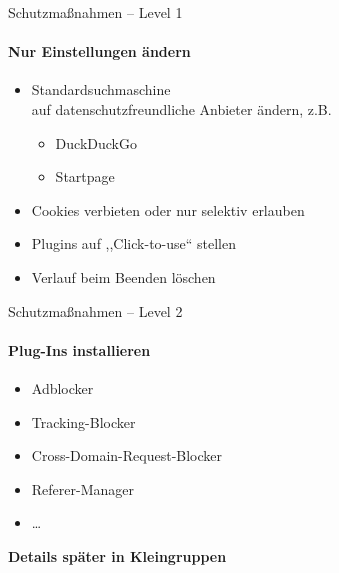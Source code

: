 \begin{frame}{Schutzmaßnahmen -- Level 1}
\framesubtitle{Nur Einstellungen ändern}
  \begin{itemize}
    \item Standardsuchmaschine\\ auf datenschutzfreundliche Anbieter ändern, z.B.
    \begin{itemize}
      \item DuckDuckGo
      \item Startpage
    \end{itemize}
    \item Cookies verbieten oder nur selektiv erlauben
    \item Plugins auf ,,Click-to-use`` stellen
    \item Verlauf beim Beenden löschen
  \end{itemize}

\end{frame}

\begin{frame}{Schutzmaßnahmen -- Level 2}
\framesubtitle{Plug-Ins installieren}
  \begin{itemize}
    \item Adblocker
    \item Tracking-Blocker
    \item Cross-Domain-Request-Blocker
    \item Referer-Manager
    \item \ldots
  \end{itemize}
  \pause
  \textbf{Details später in Kleingruppen}
\end{frame}

